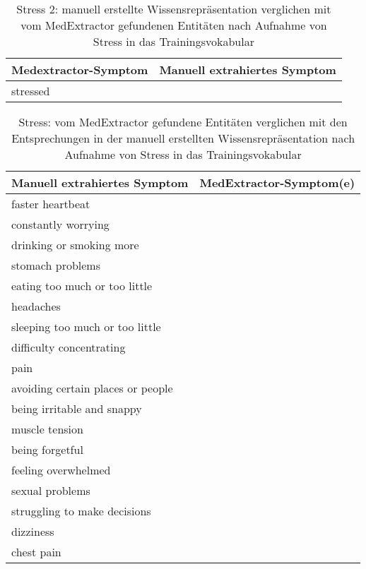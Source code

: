 \begin{table}[H]
\begin{center}
\begin{tabular}{ll}
\toprule
  Medextractor-Symptom &                       Manuell extrahiertes Symptom \\
\midrule
           stressed &                  \\
\bottomrule
\end{tabular}
\caption{Stress 2: manuell erstellte Wissensrepräsentation verglichen mit vom MedExtractor gefundenen Entitäten nach Aufnahme von Stress in das Trainingsvokabular}
\label{tab:stress_vergleich_manuell_medextractor}
\end{center}
\end{table}


\begin{table}[H]
\begin{center}
\begin{tabular}{ll}
\toprule
                      Manuell extrahiertes Symptom &       MedExtractor-Symptom(e) \\
\midrule
                 faster heartbeat &               \\
              constantly worrying &               \\
         drinking or smoking more &               \\
                 stomach problems &               \\
    eating too much or too little &               \\
                        headaches &               \\
  sleeping too much or too little &               \\
         difficulty concentrating &               \\
                             pain &               \\
avoiding certain places or people &               \\
       being irritable and snappy &               \\
                   muscle tension &               \\
                  being forgetful &               \\
              feeling overwhelmed &               \\
                  sexual problems &               \\
     struggling to make decisions &               \\
                        dizziness &               \\
                       chest pain &               \\
\bottomrule
\end{tabular}
\caption{Stress: vom MedExtractor gefundene Entitäten verglichen mit den Entsprechungen in der manuell erstellten Wissensrepräsentation nach Aufnahme von Stress in das Trainingsvokabular}
\label{tab:stress_medextractor_manuell}
\end{center}
\end{table}


